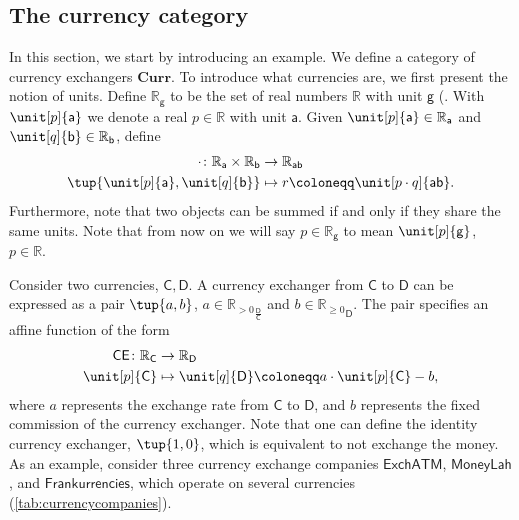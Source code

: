 \subsection{The currency category}
In this section, we start by introducing an example. We define a category of currency exchangers $\mathbf{Curr}$. To introduce what currencies are, we first present the notion of units. Define $\mathbb{R}_\mathsf{g}$ to be the set of real numbers $\mathbb{R}$ with unit $\mathsf{g}$ (. With $\unit[p]{\mathsf{a}}$ we denote a real $p\in \mathbb{R}$ with unit $\mathsf{a}$. Given $\unit[p]{\mathsf{a}} \in \mathbb{R}_\mathsf{a}$ and $\unit[q]{\mathsf{b}}\in \mathbb{R}_\mathsf{b}$, define
    \begin{equation}
    \begin{aligned}
    \cdot \colon \mathbb{R}_\mathsf{a} \times \mathbb{R}_\mathsf{b} &\to \mathbb{R}_\mathsf{ab}\\
    \tup{\unit[p]{\mathsf{a}},\unit[q]{\mathsf{b}}}&\mapsto r\coloneqq \unit[p\cdot q]{\mathsf{ab}}.
    \end{aligned}
    \end{equation}
Furthermore, note that two objects can be summed if and only if they share the same units. Note that from now on we will say $p\in \mathbb{R}_\mathsf{g}$ to mean $\unit[p]{\mathsf{g}}$, $p\in \mathbb{R}$.

\noindent Consider two currencies, $\mathsf{C,D}$. A currency exchanger from $\mathsf{C}$ to $\mathsf{D}$ can be expressed as a pair $\tup{a,b}$, $a\in {\mathbb{R}_{>0}}_ {\frac{\mathsf{D}}{\mathsf{C}}}$ and $b\in {\mathbb{R}_{\geq 0}}_ {\mathsf{D}}$. The pair specifies an affine function of the form
\begin{equation}
        \begin{aligned}
        \mathsf{CE}\colon \mathbb{R}_\mathsf{C}&\to \mathbb{R}_\mathsf{D}\\
        \unit[p]{\mathsf{C}}&\mapsto \unit[q]{\mathsf{D}} \coloneqq a\cdot \unit[p]{\mathsf{C}} -b,
        \end{aligned}
    \end{equation}
   where $a$ represents the exchange rate from $\mathsf{C}$ to $\mathsf{D}$, and $b$ represents the fixed commission of the currency exchanger. Note that one can define the identity currency exchanger, $\tup{1,0}$, which is equivalent to not exchange the money. As an example, consider three currency exchange companies $\mathsf{ExchATM}$, $\mathsf{MoneyLah}$, and $\mathsf{Frankurrencies}$, which operate on several currencies (\cref{tab:currencycompanies}).
   
